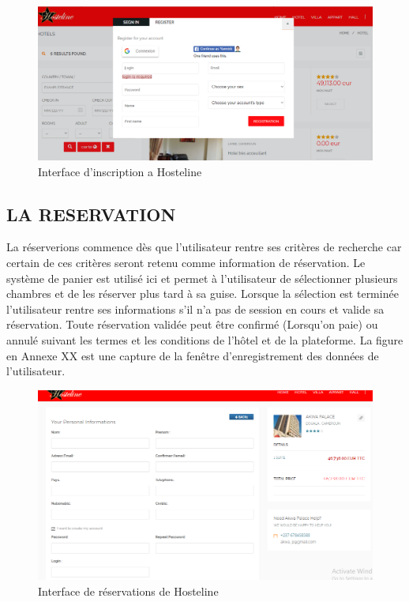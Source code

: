 \begin{figure}[!htbp]
	\begin{center}
		\includegraphics[scale=0.55]{images/inscription.png}
		\caption{ Interface d’inscription a Hosteline}
		\label{classe_diagramme}
	\end{center}
\end{figure}

\cleardoublepage
\subsection{LA RESERVATION}
La réserverions commence dès que l’utilisateur rentre ses critères de recherche car certain de ces critères seront retenu comme information de réservation. Le système de panier est utilisé ici et permet à l’utilisateur de sélectionner plusieurs chambres et de les réserver plus tard à sa guise. Lorsque la sélection est terminée l’utilisateur rentre ses informations s’il n’a pas de session en cours et valide sa réservation. Toute réservation validée peut être confirmé (Lorsqu’on paie) ou annulé suivant les termes et les conditions de l’hôtel et de la plateforme. La figure en Annexe XX est une capture de la fenêtre d’enregistrement des données de l’utilisateur.
\begin{figure}[!htbp]
	\begin{center}
		\includegraphics[scale=0.55]{images/reservation.png}
		\caption{Interface de réservations de Hosteline}
		\label{classe_diagramme}
	\end{center}
\end{figure}

